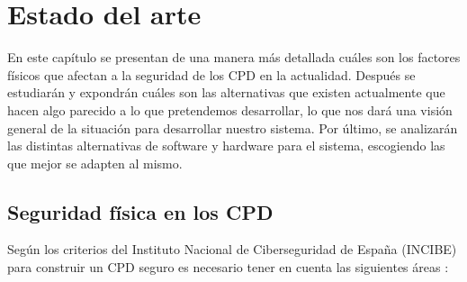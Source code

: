 \chapter{Estado del arte}
\label{ch:estado}
En este capítulo se presentan de una manera más detallada cuáles son los factores físicos que afectan a la seguridad de los CPD en la actualidad. Después se estudiarán y expondrán cuáles son las alternativas que existen actualmente que hacen algo parecido a lo que pretendemos desarrollar, lo que nos dará una visión general de la situación para desarrollar nuestro sistema. Por último, se analizarán las distintas alternativas de software y hardware para el sistema, escogiendo las que mejor se adapten al mismo.

\section{Seguridad física en los CPD}\label{sec:seguridad_fisica_CPD}
Según los criterios del Instituto Nacional de Ciberseguridad de España (INCIBE) para construir un CPD seguro es necesario tener en cuenta las siguientes áreas \cite{noauthor_pon_2015}:
